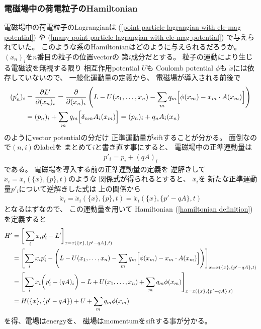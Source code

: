 \subsubsection{電磁場中の荷電粒子のHamiltonian}

電磁場中の荷電粒子のLagrangianは
(\ref{point particle lagrangian with ele-mag potential})
や
(\ref{many point particle lagrangian with ele-mag potential})
で与えられていた。
このような系のHamiltonianはどのように与えられるだろうか。
$(x_n)_i$を$n$番目の粒子の位置vectorの
第$i$成分だとする。
粒子の運動により生じる電磁波を無視する限り
相互作用potential $U$も
Coulomb potential $\phi$も
$\dot{x}$には依存していないので、
一般化運動量の定義から、
電磁場が導入される前後で
\begin{align}
  (p_n')_i
  &=
  \dfrac{\partial L'}{\partial (x_n)_i}
  =
  \dfrac{\partial}{\partial (x_n)_i}
  \left(
    L
  -
    U(x_1, \dots, x_n)
  -
    \sum_m
    q_m
    \Big[
      \phi(x_m)
    -
      x_m \cdot A(x_m)
    \Big]
  \right)
\notag\\&
  =
  (p_n)_i
  +
  \sum_m
    q_m
    \Big[
      \delta_{nm} A_i(x_m)
    \Big]
=
  (p_n)_i
  +
  q_n
  A_i(x_n)
\end{align}
のようにvector potentialの分だけ
正準運動量がsiftすることが分かる。
面倒なので$(n,i)$のlabelを
まとめて$i$と書き直す事にすると、
電磁場中の正準運動量は
\begin{align}
  p'_i = p_i + (q A)_i
\end{align}
である。
電磁場を導入する前の正準運動量の定義を
逆解きして
$\dot{x}_i = \dot{x}_i(\{x\},\{p\},t)$のような
関係式が得られるとすると、
$\dot{x}_i$を
新たな正準運動量$p'_i$について逆解きした式は
上の関係から
\begin{align}
  \dot{x}_i = \dot{x}_i(\{x\},\{p\},t)
  =
  \dot{x}_i(\{x\},\{p' - q A\},t)
\end{align}
となるはずなので、
この運動量を用いて
Hamiltonian
(\ref{hamiltonian definition})を定義すると
\begin{align}
  H'
  &=
  \bigg[
    \sum_i
      x_i p'_i
  - L'
  \bigg]_{
    x =
    x(\{x\},\{p' - q A\},t)
  }
\notag\\&
  =
  \left[
    \sum_i
      x_i
      p_i'
  -
  \left(
    L
  -
    U(x_1, \dots, x_n)
  -
    \sum_m
    q_m
    \Big[
      \phi(x_m)
    -
      x_m \cdot A(x_m)
    \Big]
  \right)
  \right]_{
    x
    =
    x(\{x\},\{p' - qA\},t)
  }
\notag\\&
  =
  \left[
    \sum_i
      x_i
      \bigg(
        p_i' - (q A)_i
      \bigg)
      -
      L
  +
    U(x_1, \dots, x_n)
  +
    \sum_m
    q_m
      \phi(x_m)
  \right]_{
    x
    =
    x(\{x\},\{p' - qA\},t)
  }
\notag\\&
  =
    H(\{x\},\{p' - qA\})
  +
    U
  +
  \sum_m
    q_m
    \phi(x_m)
\end{align}
を得、電場はenergyを、
磁場はmomentumをsiftする事が分かる。

